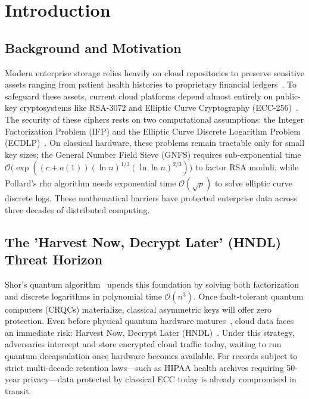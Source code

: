 \documentclass[sn-mathphys,Numbered]{sn-jnl}%
\theoremstyle{thmstyleone}%
\theoremstyle{thmstyletwo}%
\theoremstyle{thmstylethree}%
\begin{document}

\maketitle

\section{Introduction}\label{sec:intro}

\subsection{\textbf{Background and Motivation}}
Modern enterprise storage relies heavily on cloud repositories to preserve sensitive assets ranging from patient health histories to proprietary financial ledgers~\cite{mell2011nist}. To safeguard these assets, current cloud platforms depend almost entirely on public-key cryptosystems like RSA-3072 and Elliptic Curve Cryptography (ECC-256)~\cite{boneh2020graduate}. The security of these ciphers rests on two computational assumptions: the Integer Factorization Problem (IFP) and the Elliptic Curve Discrete Logarithm Problem (ECDLP)~\cite{katz2020introduction}. On classical hardware, these problems remain tractable only for small key sizes; the General Number Field Sieve (GNFS) requires sub-exponential time $\mathcal{O}\big(\exp((c + o(1)) (\ln n)^{1/3} (\ln \ln n)^{2/3})\big)$ to factor RSA moduli, while Pollard's rho algorithm needs exponential time $\mathcal{O}(\sqrt{p})$ to solve elliptic curve discrete logs. These mathematical barriers have protected enterprise data across three decades of distributed computing.

\subsection{\textbf{The 'Harvest Now, Decrypt Later' (HNDL) Threat Horizon}}
Shor's quantum algorithm~\cite{shor1994algorithms} upends this foundation by solving both factorization and discrete logarithms in polynomial time $\mathcal{O}(n^3)$. Once fault-tolerant quantum computers (CRQCs) materialize, classical asymmetric keys will offer zero protection. Even before physical quantum hardware matures~\cite{mosca2022quantum}, cloud data faces an immediate risk: Harvest Now, Decrypt Later (HNDL)~\cite{chen2016report}. Under this strategy, adversaries intercept and store encrypted cloud traffic today, waiting to run quantum decapsulation once hardware becomes available. For records subject to strict multi-decade retention laws---such as HIPAA health archives requiring 50-year privacy---data protected by classical ECC today is already compromised in transit.
\end{document}
